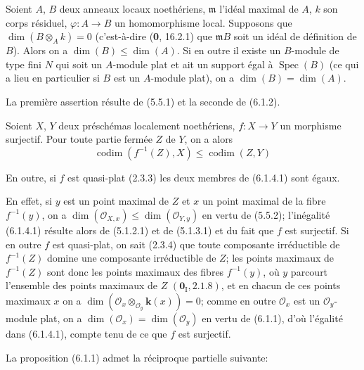 \begin{corollary}[6.1.3]
Soient $A$, $B$ deux anneaux locaux noethériens, $\mathfrak m$ l'idéal maximal
de $A$, $k$ son corps résiduel, $\varphi:A\to B$ un homomorphisme local.
Supposons que $\dim(B\otimes_Ak)=0$ \textup{(c'est-à-dire (\textbf{0}, 16.2.1) que
$\mathfrak mB$ soit un} idéal de définition \textup{de $B$)}. Alors on a
$\dim(B)\leq\dim(A)$. Si en outre il existe un $B$-module de type fini $N$ qui
soit un $A$-module plat et ait un support égal à $\operatorname{Spec}(B)$
\textup{(ce qui a lieu en particulier si $B$ est un $A$-module} plat), on a
$\dim(B)=\dim(A)$.
\end{corollary}

La première assertion résulte de (5.5.1) et la seconde de (6.1.2).

\begin{corollary}[6.1.4]
\label{IV.2.s6.1.4-fr}
Soient $X$, $Y$ deux préschémas localement noethériens, $f:X\to Y$ un
morphisme surjectif. Pour toute partie fermée $Z$ de $Y$, on a alors
\begin{equation}
\operatorname{codim}(f^{-1}(Z),X)\leq\operatorname{codim}(Z,Y)
\tag{6.1.4.1}\label{IV.2.s6.1.4.1-fr}
\end{equation}

En outre, si $f$ est quasi-plat \textup{(2.3.3)} les deux membres de \textup{(6.1.4.1)} sont
égaux.
\end{corollary}

En effet, si $y$ est un point maximal de $Z$ et $x$ un point maximal de la
fibre $f^{-1}(y)$, on a
$\dim(\mathcal O_{X,x})\leq\dim(\mathcal O_{Y,y})$ en vertu de (5.5.2);
l'inégalité (6.1.4.1) résulte alors de (5.1.2.1) et de (5.1.3.1) et du fait
que $f$ est surjectif. Si en outre $f$ est quasi-plat, on sait (2.3.4) que
toute composante irréductible de $f^{-1}(Z)$ domine une composante
irréductible de $Z$; les points maximaux de $f^{-1}(Z)$ sont donc les points
maximaux des fibres $f^{-1}(y)$, où $y$ parcourt l'ensemble des points maximaux
de $Z$ $(\mathbf{0}_{\mathrm I}, 2.1.8)$, et en chacun de ces points maximaux $x$ on a
$\dim(\mathcal O_x\otimes_{\mathcal O_y}\boldsymbol{k}(x))=0$; comme en outre
$\mathcal O_x$ est un $\mathcal O_y$-module plat, on a
$\dim(\mathcal O_x)=\dim(\mathcal O_y)$ en vertu de (6.1.1), d'où l'égalité
dans (6.1.4.1), compte tenu de ce que $f$ est surjectif.

La proposition (6.1.1) admet la réciproque partielle suivante:

